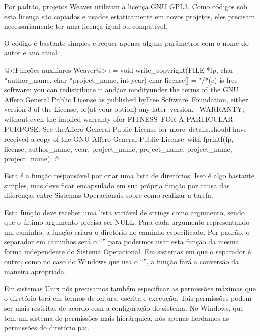 {

Por padrão, projetos Weaver utilizam a licença GNU GPL3. Como códigos
sob esta licença são copiados e usados estaticamente em novos
projetos, eles precisam necessariamente ter uma licença igual ou
compatível.

O código é bastante simples e requer apenas alguns parâmetros com o
nome do autor e ano atual:

\iniciocodigo
@<Funções auxiliares Weaver@>+=
void write_copyright(FILE *fp, char *author_name, char *project_name, int year){
  char license[] = "/*\nCopyright (c) %
 is free software: you can redistribute it and/or modify\nit under the terms of\
 the GNU Affero General Public License as published by\nthe Free Software\ 
 Foundation, either version 3 of the License, or\n(at your option) any later\
 version.\n\n\
  WARRANTY; without even the implied warranty of\nMERCHANTABILITY or FITNESS\
  FOR A PARTICULAR PURPOSE.  See the\nGNU Affero General Public License for more\
  details.\n\nYou should have received a copy of the GNU Affero General Public License\
\nalong with %
  fprintf(fp, license, author_name, year, project_name, project_name,
          project_name, project_name);
}
@
\fimcodigo

\subsecao{5.8. create\_dir: Cria novos diretórios}

Esta é a função responsável por criar uma lista de diretórios. Isso é
algo bastante simples, mas deve ficar encapsulado em sua própria
função por causa das diferenças entre Sistemas Operacionais sobre como
realizar a tarefa.

Esta função deve receber uma lista variável de strings como argumento,
sendo que o último argumento precisa ser NULL. Para cada argumento
representando um caminho, a função criará o diretório no caminho
especificado. Por padrão, o separador em caminhos será o
``\monoespaco{/}'' para podermos usar esta função da mesma forma
independente do Sistema Operacional. Em sistemas em que o separador é
outro, como no caso do Windows que usa o ``\monoespaco{\\}'', a função
fará a conversão da maneira apropriada.

Em sistemas Unix nós precisamos também especificar as permissões
máximas que o diretório terá em termos de leitura, escrita e
execução. Tais permissões podem ser mais restritas de acordo com a
configuração do sistema. No Windows, que tem um sistema de permissões
mais hierárquica, nós apenas herdamos as permissões do diretório pai.

}
